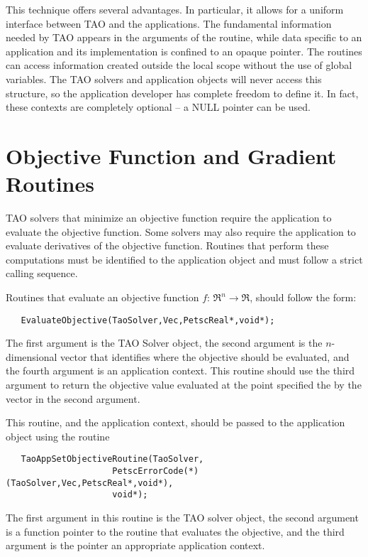 This technique offers several advantages.
In particular, it allows for a uniform interface between TAO and 
the applications.   The fundamental information needed by TAO 
appears in the arguments of the routine, while data specific to an application
and its implementation is confined to an opaque pointer.
The routines can access information created outside the 
local scope without the use of global variables.
The TAO solvers and application objects will never access this structure, 
so the application developer has complete freedom to define it.  In fact,
these contexts are completely optional -- a NULL pointer can be used.



\section{Objective Function and Gradient Routines}\label{sec:fghj}

TAO solvers that minimize an objective function require
the application to evaluate the objective function.  Some solvers
may also require the application to evaluate
derivatives of the objective function.  
Routines that perform these computations must be identified
to the application object and must follow a strict calling sequence.

Routines that evaluate an objective function $f: \, \Re^n \to \Re$,
should follow the form:
\begin{verbatim}
   EvaluateObjective(TaoSolver,Vec,PetscReal*,void*);
\end{verbatim}
\noindent
The first argument is the TAO Solver object, the second argument is the
$n$-dimensional vector that identifies where the objective should be evaluated, 
and the fourth argument is an application context.
This routine should use the third argument to return the objective value 
evaluated at the point
specified the by the vector in the second argument.

This routine, and the application context, should be passed to the 
application object using
the routine 
\begin{verbatim}
   TaoAppSetObjectiveRoutine(TaoSolver,
                     PetscErrorCode(*)(TaoSolver,Vec,PetscReal*,void*),
                     void*);
\end{verbatim}
\noindent
The first argument in this routine is the TAO solver object, 
the second argument is a function pointer to the routine that 
evaluates the objective, and the third
argument is the pointer an appropriate application context.  

